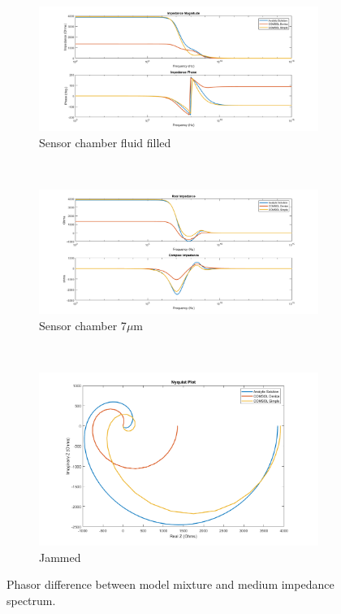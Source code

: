 \begin{figure}[h]
    \centering
    \begin{subfigure}[b]{\textwidth}
        \centering
        \includegraphics[width=\textwidth]{images/IS_model_difference_mag_phase.png}
        \caption{Sensor chamber fluid filled}
    \end{subfigure}
    \\
    \vspace{0.1 in}
    \begin{subfigure}[b]{\textwidth}
        \centering
        \includegraphics[width=\textwidth]{images/IS_model_difference_real_imag.png}
        \caption{Sensor chamber 7$\mu$m }
    \end{subfigure}
    \\
    \vspace{0.1 in}
    \begin{subfigure}[b]{\textwidth}
        \centering
        \includegraphics[width=\textwidth]{images/IS_model_difference_nyquist.png}
        \caption{Jammed}
    \end{subfigure}
    \caption[Phasor difference between model mixture and medium impedance spectrum.]{Phasor difference between model mixture and medium impedance spectrum.}
    \label{fig:single_cell_model_IS_data}
\end{figure}

